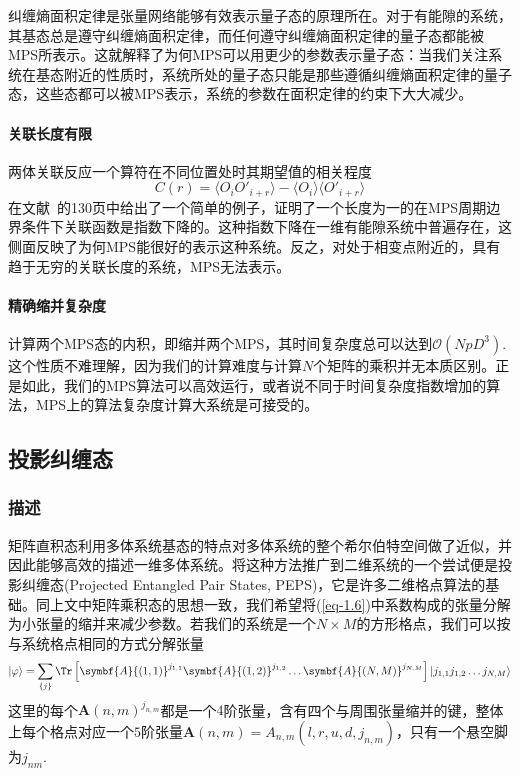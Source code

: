 纠缠熵面积定律是张量网络能够有效表示量子态的原理所在。对于有能隙的系统，其基态总是遵守纠缠熵面积定律，而任何遵守纠缠熵面积定律的量子态都能被MPS所表示\cite{eisertEntanglementTensorNetwork2013}。这就解释了为何MPS可以用更少的参数表示量子态：当我们关注系统在基态附近的性质时，系统所处的量子态只能是那些遵循纠缠熵面积定律的量子态，这些态都可以被MPS表示，系统的参数在面积定律的约束下大大减少。

\paragraph{关联长度有限}

两体关联反应一个算符在不同位置处时其期望值的相关程度
\begin{equation}
C(r) = \langle O_i O'_{i+r}\rangle - \langle O_i\rangle\langle O'_{i+r}\rangle
\end{equation}
在文献~的130页中给出了一个简单的例子，证明了一个长度为一的在MPS周期边界条件下关联函数是指数下降的。这种指数下降在一维有能隙系统中普遍存在，这侧面反映了为何MPS能很好的表示这种系统。反之，对处于相变点附近的，具有趋于无穷的关联长度的系统，MPS无法表示。

\paragraph{精确缩并复杂度}

计算两个MPS态的内积，即缩并两个MPS，其时间复杂度总可以达到$\mathcal{O}(NpD^3)$. 这个性质不难理解，因为我们的计算难度与计算$N$个矩阵的乘积并无本质区别。正是如此，我们的MPS算法可以高效运行，或者说不同于时间复杂度指数增加的算法，MPS上的算法复杂度计算大系统是可接受的。

\subsection{投影纠缠态}
\subsubsection{描述}

矩阵直积态利用多体系统基态的特点对多体系统的整个希尔伯特空间做了近似，并因此能够高效的描述一维多体系统。将这种方法推广到二维系统的一个尝试便是投影纠缠态(Projected Entangled Pair States, PEPS)，它是许多二维格点算法的基础。同上文中矩阵乘积态的思想一致，我们希望将(\ref{eq-1.6})中系数构成的张量分解为小张量的缩并来减少参数。若我们的系统是一个$N\times M$的方形格点，我们可以按与系统格点相同的方式分解张量
\begin{equation}\label{PEPS_PBC}
\ket{\varphi} = \sum_{\{j\}} \Tr\left[ \symbf{A}{(1,1)}^{j_{1,1}} \symbf{A}{(1,2)}^{j_{1,2}}\dots \symbf{A}{(N,M)}^{j_{N,M}} \right]\ket{j_{1,1} j_{1,2}\dots j_{N,M}}
\end{equation}
这里的每个$\symbf{A}{(n,m)}^{j_{n,m}}$都是一个$4$阶张量，含有四个与周围张量缩并的键，整体上每个格点对应一个$5$阶张量$\symbf{A}{(n,m)} = A_{n,m}(l,r,u,d,j_{n,m})$，只有一个悬空脚为$j_{nm}$.

